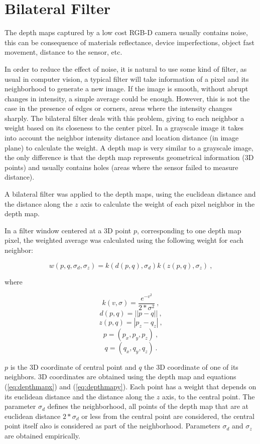 \section{Bilateral Filter}


The depth maps captured by a low cost RGB-D camera usually contains noise, this can be 
consequence of materials reflectance, device imperfections, object fast movement, distance to the 
sensor, etc. 

In order to reduce the effect of noise, it is natural to use some kind of filter, as usual in computer 
vision, a typical filter will take information of a pixel and its neighborhood to generate a new image. 
If the image is smooth, without abrupt changes in intensity, a simple average could be enough. However, this 
is not the case in the presence of edges or corners, areas where the intensity changes sharply. 
The bilateral filter deals with this problem, giving to each neighbor a weight based on its closeness  
to the center pixel. In a grayscale image it takes into account 
the neighbor intensity distance and location distance (in image plane) to calculate the weight.  A depth map is very similar to a grayscale 
image, the only difference is that the depth map represents geometrical information (3D points) and usually contains holes 
(areas where the sensor failed to measure distance). 

A bilateral filter was applied to the depth maps, using the euclidean distance and the distance along the $z$ axis to calculate 
the weight of each pixel neighbor in the depth map. 

In a filter window centered at a 3D point $p$, corresponding to one depth map pixel, 
the weighted average was calculated using the following weight for each neighbor:


$$ w(p,q,\sigma_d,\sigma_z) = k(d(p,q),\sigma_d) k(z(p,q),\sigma_z)\ , $$

\noindent where 

$$ k(v,\sigma) = \frac{e^{-v^2}}{2*\sigma^2}\ , $$
$$ d(p,q) = ||p - q||\ , $$
$$ z(p,q) = |p_z - q_z|\ , $$
$$ p = (p_x,p_y,p_z)\ , $$ 
$$ q = (q_x,q_y,q_z)\ . $$

\noindent $p$ is the 3D coordinate of central point and $q$ the 3D coordinate of one of its neighbors. 3D coordinates are obtained using
 the depth map and equations (\ref{eq:depthmapx}) and (\ref{eq:depthmapy}).  Each point has a weight that depends on its euclidean distance and
 the distance along the $z$ axis, to the central point. The parameter $\sigma_d$ defines 
the neighborhood, all points of the depth map that are at euclidean distance $2*\sigma_d$ or less from the central point are considered, the 
central point itself also is considered as part of the neighborhood. Parameters $\sigma_d$ and $\sigma_z$ are obtained empirically.



